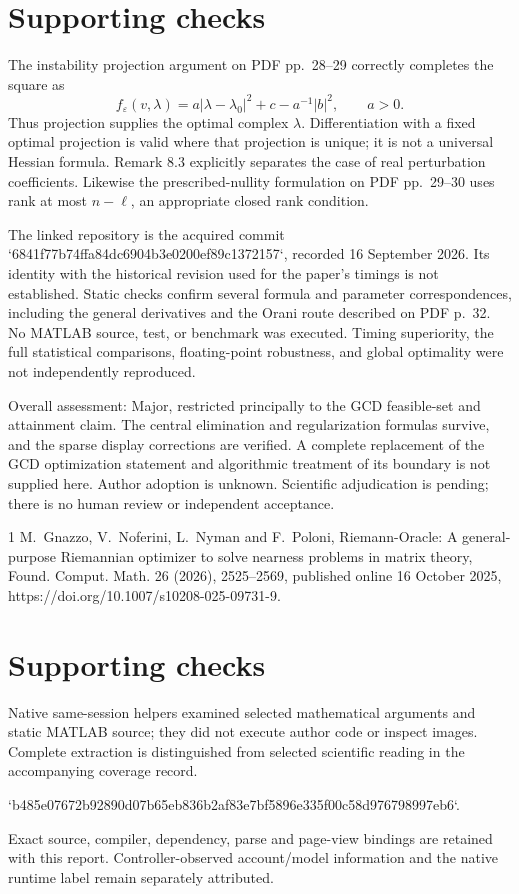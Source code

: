 \documentclass[10pt]{article}
\begin{document}
\section*{Supporting checks}
The instability projection argument on PDF pp. 28–29 correctly completes the square as \[f_\varepsilon(v,\lambda)
 =a|\lambda-\lambda_0|^2+c-a^{-1}|b|^2,\qquad a>0 .\] Thus projection supplies the optimal complex \(\lambda\). Differentiation with a fixed optimal projection is valid where that projection is unique; it is not a universal Hessian formula. Remark 8.3 explicitly separates the case of real perturbation coefficients. Likewise the prescribed-nullity formulation on PDF pp. 29–30 uses rank at most \(n-\ell\), an appropriate closed rank condition.\par
The linked repository is the acquired commit `6841f77b74ffa84dc6904b3e0200ef89c1372157`, recorded 16 September 2026. Its identity with the historical revision used for the paper’s timings is not established. Static checks confirm several formula and parameter correspondences, including the general derivatives and the Orani route described on PDF p. 32. No MATLAB source, test, or benchmark was executed. Timing superiority, the full statistical comparisons, floating-point robustness, and global optimality were not independently reproduced.\par
Overall assessment: Major, restricted principally to the GCD feasible-set and attainment claim. The central elimination and regularization formulas survive, and the sparse display corrections are verified. A complete replacement of the GCD optimization statement and algorithmic treatment of its boundary is not supplied here. Author adoption is unknown. Scientific adjudication is pending; there is no human review or independent acceptance.\par
1 M. Gnazzo, V. Noferini, L. Nyman and F. Poloni, Riemann-Oracle: A general-purpose Riemannian optimizer to solve nearness problems in matrix theory, Found. Comput. Math. 26 (2026), 2525–2569, published online 16 October 2025, https://doi.org/10.1007/s10208-025-09731-9.\par
\section*{Supporting checks}
Native same-session helpers examined selected mathematical arguments and static MATLAB source; they did not execute author code or inspect images. Complete extraction is distinguished from selected scientific reading in the accompanying coverage record.\par
`b485e07672b92890d07b65eb836b2af83e7bf5896e335f00c58d976798997eb6`.\par
Exact source, compiler, dependency, parse and page-view bindings are retained with this report. Controller-observed account/model information and the native runtime label remain separately attributed.\par
\end{document}
